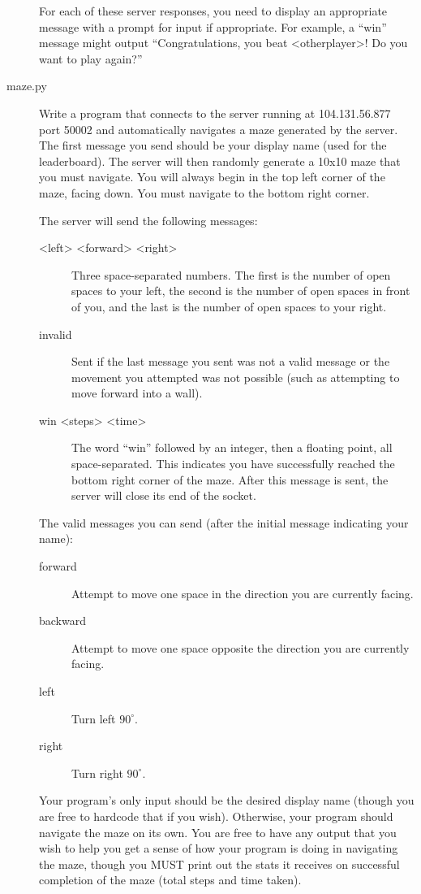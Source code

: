 \documentclass[11pt]{cselabheader}
\begin{document}
\begin{description}
  For each of these server responses, you need to display an appropriate message
  with a prompt for input if appropriate. For example, a ``win'' message might
  output ``Congratulations, you beat <otherplayer>! Do you want to play again?''

\item[maze.py] Write a program that connects to the server running at 104.131.56.877 port 50002
  and automatically navigates a maze generated by the server. The first message you send should be
  your display name (used for the leaderboard). The server will then randomly generate a 10x10
  maze that you must navigate. You will always begin in the top left corner of the maze, facing
  down. You must navigate to the bottom right corner.

  The server will send the following messages:

  \begin{description}
  \item[<left> <forward> <right>] Three space-separated numbers. The first is the number of open
    spaces to your left, the second is the number of open spaces in front of you, and the last is
    the number of open spaces to your right.
  \item[invalid] Sent if the last message you sent was not a valid message or the movement you
    attempted was not possible (such as attempting to move forward into a wall).
  \item[win <steps> <time>] The word ``win'' followed by an integer, then a floating point,
    all space-separated. This indicates you have successfully reached the bottom right corner of
    the maze. After this message is sent, the server will close its end of the socket.
  \end{description}

  The valid messages you can send (after the initial message indicating your name):

  \begin{description}
  \item[forward] Attempt to move one space in the direction you are currently facing.
  \item[backward] Attempt to move one space opposite the direction you are currently facing.
  \item[left] Turn left $90^{\circ}$.
  \item[right] Turn right $90^{\circ}$.
  \end{description}

  Your program's only input should be the desired display name (though you are free to hardcode
  that if you wish). Otherwise, your program should navigate the maze on its own. You are free
  to have any output that you wish to help you get a sense of how your program is doing in
  navigating the maze, though you MUST print out the stats it receives on successful completion of
  the maze (total steps and time taken).
  
\end{description}
\end{document}
